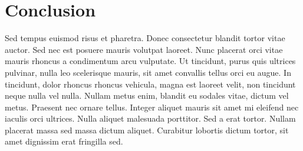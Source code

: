 \documentclass[11pt,letterpaper]{article}
\begin{document}
\section{Conclusion}

Sed tempus euismod risus et pharetra. Donec consectetur blandit tortor vitae auctor. Sed nec est posuere mauris volutpat laoreet. Nunc placerat orci vitae mauris rhoncus a condimentum arcu vulputate. Ut tincidunt, purus quis ultrices pulvinar, nulla leo scelerisque mauris, sit amet convallis tellus orci eu augue. In tincidunt, dolor rhoncus rhoncus vehicula, magna est laoreet velit, non tincidunt neque nulla vel nulla. Nullam metus enim, blandit eu sodales vitae, dictum vel metus. Praesent nec ornare tellus. Integer aliquet mauris sit amet mi eleifend nec iaculis orci ultrices. Nulla aliquet malesuada porttitor. Sed a erat tortor. Nullam placerat massa sed massa dictum aliquet. Curabitur lobortis dictum tortor, sit amet dignissim erat fringilla sed.



\end{document}
